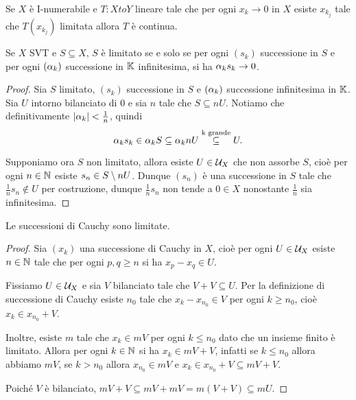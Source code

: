 \begin{exercise}
Se $X$ \`e I-numerabile e $T:Xto Y$ lineare tale che per ogni $x_k\to 0$ in $X$ esiste $x_{k_j}$ tale che $T(x_{k_j})$ limitata allora $T$ \`e continua.
\end{exercise}

\begin{proposition}\label{PrCaratterizzazioneSequenzialeLimitatezza}
Se $X$ SVT e $S\subseteq X$, $S$ \`e limitato se e solo se per ogni $(s_k)$ successione in $S$ e per ogni $(\alpha_k)$ successione in $\mathbb{K}$ infinitesima, si ha $\alpha_k s_k\to 0$.
\end{proposition}
\begin{proof}
Sia $S$ limitato, $(s_k)$ successione in $S$ e $(\alpha_k)$ successione infinitesima in $\mathbb{K}$. Sia $U$ intorno bilanciato di $0$ e sia $n$ tale che $S\subseteq nU$. Notiamo che definitivamente $\left|{\alpha_k}\right|<\frac1n$, quindi
\[\alpha_k s_k\in \alpha_k S\subseteq \alpha_k nU\overset{\text{k grande}}{\subseteq} U.\]

Supponiamo ora $S$ non limitato, allora esiste $U\in\mathcal{U}_X$ che non assorbe $S$, cio\`e per ogni $n\in\mathbb{N}$ esiste $s_n\in S\setminus nU$. Dunque $(s_n)$ \`e una successione in $S$ tale che $\frac1n s_n\notin U$ per costruzione, dunque $\frac1n s_n$ non tende a $0\in X$ nonostante $\frac1n$ sia infinitesima.
\end{proof}

\begin{proposition}\label{PrSuccessioniCauchyLimitate}
Le successioni di Cauchy sono limitate.
\end{proposition}
\begin{proof}
Sia $(x_k)$ una successione di Cauchy in $X$, cio\`e per ogni $U\in \mathcal{U}_X$ esiste $n\in\mathbb{N}$ tale che per ogni $p,q\geq n$ si ha $x_p-x_q\in U$.

Fissiamo $U\in \mathcal{U}_X$ e sia $V$ bilanciato tale che $V+V\subseteq U$. Per la definizione di successione di Cauchy esiste $n_0$ tale che $x_k-x_{n_0}\in V$ per ogni $k\geq n_0$, cio\`e $x_k\in x_{n_0}+V$.

Inoltre, esiste $m$ tale che $x_k\in mV$ per ogni $k\leq n_0$ dato che un insieme finito \`e limitato. Allora per ogni $k\in\mathbb{N}$ si ha $x_k\in mV+V$, infatti se $k\leq n_0$ allora abbiamo $mV$, se $k>n_0$ allora $x_{n_0}\in mV$ e $x_k\in x_{n_0}+V\subseteq mV+V$.

Poich\'e $V$ \`e bilanciato, $mV+V\subseteq mV+mV=m(V+V)\subseteq mU$.
\end{proof}

